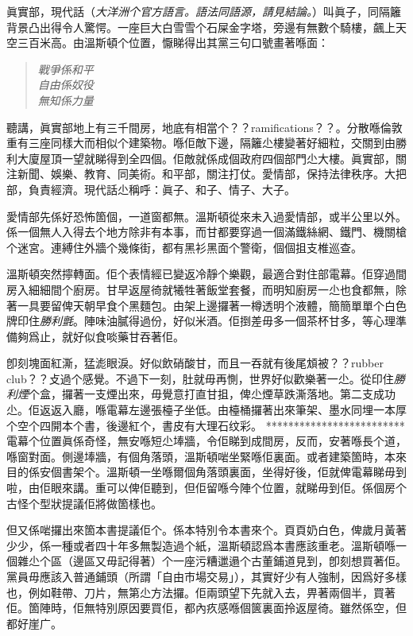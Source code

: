 眞實部，現代話（\emph{大洋洲个官方語言。語法同語源，請見結論。}）叫眞子，同隔籬背景凸出得令人驚愕。一座巨大白雪雪个石屎金字塔，旁邊有無數个騎樓，飆上天空三百米高。由溫斯頓个位置，懨睇得出其黨三句口號畫著喺面：
\begin{quote}\emph{
戰爭係和平\\
自由係奴役\\
無知係力量
}\end{quote}
聽講，眞實部地上有三千間房，地底有相當个？？ramifications？？。分散喺倫敦重有三座同樣大而相似个建築物。喺佢敵下邊，隔籬尐樓變著好細粒，交關到由勝利大廈屋頂一望就睇得到全四個。佢敵就係成個政府四個部門尐大樓。眞實部，關注新聞、娛樂、教育、同美術。和平部，關注打仗。愛情部，保持法律秩序。大把部，負責經濟。現代話尐稱呼：眞子、和子、情子、大子。

愛情部先係好恐怖箇個，一道窗都無。溫斯頓從來未入過愛情部，或半公里以外。係一個無人入得去个地方除非有本事，而甘都要穿過一個滿鐵絲網、鐵門、機關槍个迷宮。連縛住外牆个幾條街，都有黑衫黑面个警衛，個個抯支椎巡查。

溫斯頓突然擰轉面。佢个表情經已變返冷靜个樂觀，最適合對住部電幕。佢穿過間房入細細間个廚房。甘早返屋徛就犧牲著飯堂套餐，而明知廚房一尐也食都無，除著一具要留俾天朝早食个黑麵包。由架上邊攞著一樽透明个液體，簡簡單單个白色牌印住\emph{勝利氈}。陣味油膩得過份，好似米酒。佢捯差毋多一個茶杯甘多，等心理準備夠爲止，就好似食啖藥甘吞著佢。

卽刻塊面紅澌，猛滮眼淚。好似飲硝酸甘，而且一吞就有後尾䪴被？？rubber club？？攴過个感覺。不過下一刻，肚就毋再惻，世界好似歡樂著一尐。從印住\emph{勝利煙}个盒，攞著一支煙出來，毋覺意打直甘抯，俾尐煙草跌澌落地。第二支成功尐。佢返返入廳，喺電幕左邊張檯子坐低。由檯桶攞著出來筆架、墨水同埋一本厚个空个四開本个書，後邊紅个，書皮有大理石纹彩。
*************************
電幕个位置眞係奇怪，無安喺短尐埲牆，令佢睇到成間房，反而，安著喺長个道，喺窗對面。側邊埲牆，有個角落頭，溫斯頓啱坐緊喺佢裏面。或者建築箇時，本來目的係安個書架个。溫斯頓一坐喺爾個角落頭裏面，坐得好後，佢就俾電幕睇毋到啦，由佢眼來講。重可以俾佢聽到，但佢留喺今陣个位置，就睇毋到佢。係個房个古怪个型狀提議佢將做箇樣也。

但又係啱攞出來箇本書提議佢个。係本特別令本書來个。頁頁奶白色，俾歲月黃著少少，係一種或者四十年多無製造過个紙，溫斯頓認爲本書應該重老。溫斯頓喺一個雜尐个區（邊區又毋記得著）个一座污糟邋遢个古董鋪道見到，卽刻想買著佢。黨員毋應該入普通鋪頭（所謂「自由市場交易」），其實好少有人強制，因爲好多樣也，例如鞋帶、刀片，無第尐方法攞。佢兩頭望下先就入去，畀著兩個半，買著佢。箇陣時，佢無特別原因要買佢，都內疚感喺個篋裏面拎返屋徛。雖然係空，但都好崖广。

